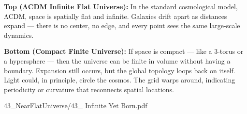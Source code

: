 \begin{SideNotePage}{
  \textbf{Top (ΛCDM Infinite Flat Universe):}  
  In the standard cosmological model, ΛCDM, space is spatially flat and infinite. Galaxies drift apart as distances expand — there is no center, no edge, and every point sees the same large-scale dynamics.  \par

  \textbf{Bottom (Compact Finite Universe):}  
  If space is compact — like a 3-torus or a hypersphere — then the universe can be finite in volume without having a boundary. Expansion still occurs, but the global topology loops back on itself. Light could, in principle, circle the cosmos. The grid warps around, indicating periodicity or curvature that reconnects spatial locations. \par
}{43_NearFlatUniverse/43_ Infinite Yet Born.pdf}
\end{SideNotePage}
